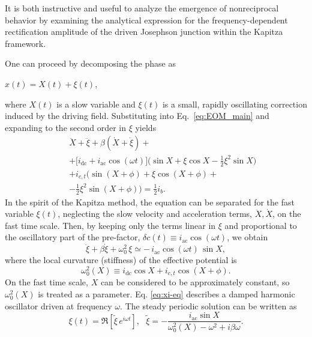 \documentclass[prl,twocolumn,superscriptaddress,showpacs,nofootinbib]{revtex4-2}
\begin{document}
It is both instructive and useful to analyze the emergence of nonreciprocal behavior by examining the analytical expression for the frequency-dependent rectification amplitude of the driven Josephson junction within the Kapitza framework.

One can proceed by decomposing the phase as

$x(t) = X(t) + \xi(t)$,

where $X(t)$ is a slow variable and $\xi(t)$ is a small, rapidly oscillating
correction induced by the driving field. Substituting into Eq.~\eqref{eq:EOM_main}
and expanding to the second order in $\xi$ yields
\begin{eqnarray*}
&&\ddot X + \ddot\xi
+ \beta(\dot X + \dot\xi)+
\\&&+ \big[i_{\mathrm{dc}}+i_{\mathrm{ac}}\cos(\omega t)\big]
    \big(\sin X + \xi\cos X - \tfrac{1}{2}\xi^2\sin X \big)
\nonumber\\
&&+ i_{c,t}\big(\sin(X+\phi) + \xi\cos(X+\phi) +\\ &&- \tfrac{1}{2}\xi^2\sin(X+\phi) \big)= \frac{1}{2} i_b .
\label{eq:expanded}
\end{eqnarray*}
In the spirit of the Kapitza method, the equation can be separated for the fast variable $\xi(t)$, neglecting the slow velocity and acceleration terms, $\ddot X,\dot X$, on the fast time scale.
Then, by keeping only the terms linear in $\xi$ and proportional to the
oscillatory part of the pre-factor, $\delta c(t)\equiv i_{\mathrm{ac}}\cos(\omega t)$, we obtain
\begin{equation}
\ddot\xi + \beta \dot\xi + \omega_0^2\,\xi
\simeq -\,i_{\mathrm{ac}}\cos(\omega t)\,\sin X ,
\label{eq:xi-eq}
\end{equation}
where the local curvature (stiffness) of the effective potential is
\begin{equation}
\omega_0^2(X)
\equiv
i_{\mathrm{dc}}\cos X + i_{c,t} \cos(X+\phi).
\label{eq:omega0-def}
\end{equation}
On the fast time scale, $X$ can be considered to be approximately constant, so $\omega_0^2(X)$ is treated as a parameter. Eq. \eqref{eq:xi-eq} describes a damped harmonic oscillator driven at frequency $\omega$. The steady periodic solution can be written as
\begin{equation}
\xi(t)=\Re\!\left[\tilde\xi\,e^{i\omega t}\right],

\ \ \
\tilde\xi=
-\frac{i_{\mathrm{ac}}\sin X}{\omega_0^2(X)-\omega^2+i\beta\omega}.
\label{eq:xi-sol-corr}
\end{equation}
\end{document}
